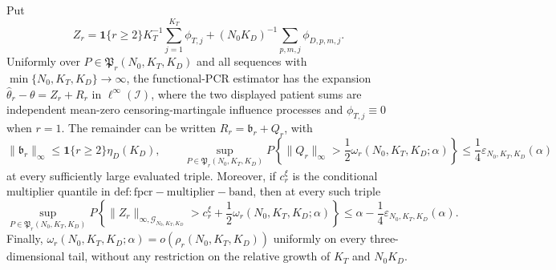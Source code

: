 Put
\[
 Z_r=\mathbf 1\{r\ge2\}K_T^{-1}\sum_{j=1}^{K_T}\phi_{T,j}+(N_0K_D)^{-1}\sum_{p,m,j}\phi_{D,p,m,j}.
\]
Uniformly over \(P\in\mathfrak P_r(N_0,K_T,K_D)\) and all sequences with \(\min\{N_0,K_T,K_D\}\to\infty\), the functional-PCR estimator has the expansion \(\widehat\theta_r-\theta=Z_r+R_r\) in \(\ell^\infty(\mathcal I)\), where the two displayed patient sums are independent mean-zero censoring-martingale influence processes and \(\phi_{T,j}\equiv0\) when \(r=1\). The remainder can be written \(R_r=\mathfrak b_r+Q_r\), with
\[
 \|\mathfrak b_r\|_\infty\le \mathbf 1\{r\ge2\}\eta_D(K_D),
 \qquad
 \sup_{P\in\mathfrak P_r(N_0,K_T,K_D)}P\!\left\{\|Q_r\|_\infty>\frac12\omega_r(N_0,K_T,K_D;\alpha)\right\}
 \le\frac14\varepsilon_{N_0,K_T,K_D}(\alpha)
\]
at every sufficiently large evaluated triple. Moreover, if \(c_r^\xi\) is the conditional multiplier quantile in \(\mathrm{def:fpcr-multiplier-band}\), then at every such triple
\[
 \sup_{P\in\mathfrak P_r(N_0,K_T,K_D)}P\!\left\{
 \|Z_r\|_{\infty,\mathcal G_{N_0,K_T,K_D}}>c_r^\xi+\frac12\omega_r(N_0,K_T,K_D;\alpha)
 \right\}
 \le \alpha-\frac14\varepsilon_{N_0,K_T,K_D}(\alpha).
\]
Finally, \(\omega_r(N_0,K_T,K_D;\alpha)=o(\rho_r(N_0,K_T,K_D))\) uniformly on every three-dimensional tail, without any restriction on the relative growth of \(K_T\) and \(N_0K_D\).